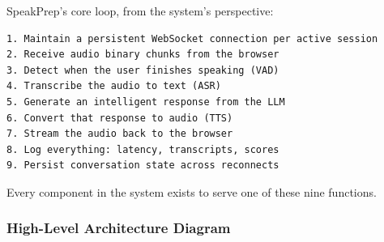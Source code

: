 \documentclass[
  11pt,
]{article}
\begin{document}
SpeakPrep's core loop, from the system's perspective:

\begin{lstlisting}
1. Maintain a persistent WebSocket connection per active session
2. Receive audio binary chunks from the browser
3. Detect when the user finishes speaking (VAD)
4. Transcribe the audio to text (ASR)
5. Generate an intelligent response from the LLM
6. Convert that response to audio (TTS)
7. Stream the audio back to the browser
8. Log everything: latency, transcripts, scores
9. Persist conversation state across reconnects
\end{lstlisting}

Every component in the system exists to serve one of these nine
functions.

\hypertarget{high-level-architecture-diagram}{%
\subsubsection{High-Level Architecture
Diagram}\label{high-level-architecture-diagram}}
\end{document}
